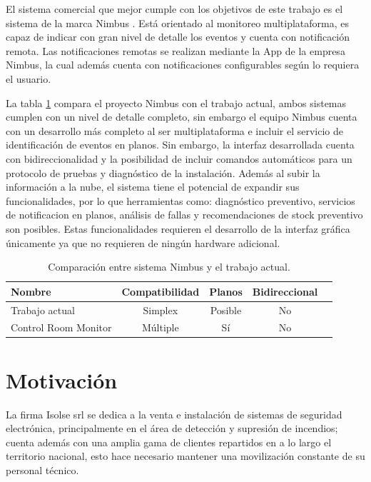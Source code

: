 El sistema comercial que mejor cumple con los objetivos de este trabajo es el sistema de la marca Nimbus \citep{nimbus}. Está orientado al monitoreo multiplataforma, es capaz de indicar con gran nivel de detalle los eventos y cuenta con notificación remota. Las notificaciones remotas se realizan mediante la App de la empresa Nimbus, la cual además cuenta con notificaciones configurables según lo requiera el usuario.

La tabla \ref{tab:comp_cese} compara el proyecto Nimbus con el trabajo actual, ambos sistemas cumplen con un nivel de detalle completo, sin embargo el equipo Nimbus cuenta con un desarrollo más completo al ser multiplataforma e incluir el servicio de identificación de eventos en planos. Sin embargo, la interfaz desarrollada cuenta con bidireccionalidad y la posibilidad de incluir comandos automáticos para un protocolo de pruebas y diagnóstico de la instalación. Además al subir la información a la nube, el sistema tiene el potencial de expandir sus funcionalidades, por lo que herramientas como: diagnóstico preventivo, servicios de notificacion en planos, análisis de fallas y recomendaciones de stock preventivo son posibles. Estas funcionalidades requieren el desarrollo de la interfaz gráfica únicamente ya que no requieren de ningún hardware adicional. 


\begin{table}[h]
\centering
\caption[caption corto]{Comparación entre sistema Nimbus y el trabajo actual.}
\begin{tabular}{l c c c c}
\toprule
\textbf{Nombre} & \textbf{Compatibilidad}&  \textbf{Planos} &\textbf{Bidireccional}\\
\midrule
Trabajo actual & Simplex & Posible & No \\
Control Room Monitor & Múltiple & Sí & No \\
\bottomrule
\hline
\end{tabular}
\label{tab:comp_cese}
\end{table}


\section{Motivación}
%
La firma Isolse srl se dedica a la venta e instalación de sistemas de seguridad electrónica, principalmente en el área de detección y supresión de incendios; cuenta además con una amplia gama de clientes repartidos en a lo largo el territorio nacional, esto hace necesario mantener una movilización constante de su personal técnico.

